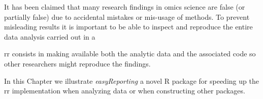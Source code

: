 


It has been claimed that many research findings in omics science are false (or partially false) due to accidental mistakes or mis-usage of methods.
To prevent misleading results it is important to be able to inspect and reproduce the entire data analysis carried out in a

\gls{rr} consists in making available both the analytic data and the associated code so other researchers might reproduce the findings. 

In this Chapter we illustrate \textit{easyReporting} a novel R package for speeding up the \gls{rr} implementation when analyzing data or when constructing other packages.